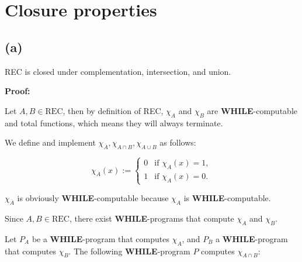 

\usepackage{graphicx}
\usepackage{xcolor}
\usepackage{listings}
\usepackage{tikz}



\setcounter{section}{1}


\section{Closure properties}

\subsection{(a)}
REC is closed under complementation, intersection, and union.

\textbf{Proof:}

Let $A, B \in \text{REC}$, then by definition of REC, $\chi_A$ and $\chi_B$ are \textbf{WHILE}-computable and total functions, which means they will always terminate.

We define and implement $\chi_{\overline{A}}, \chi_{A \cap B}, \chi_{A \cup B}$ as follows:

\[
\chi_{\overline{A}}(x) :=
\begin{cases}
    0 & \text{if } \chi_A(x) = 1, \\
    1 & \text{if } \chi_A(x) = 0.
\end{cases}
\]

$\chi_{\overline{A}}$ is obviously \textbf{WHILE}-computable because $\chi_A$ is \textbf{WHILE}-computable.

\bigskip

Since $A, B \in \text{REC}$, there exist \textbf{WHILE}-programs that compute $\chi_A$ and $\chi_B$.

Let $P_A$ be a \textbf{WHILE}-program that computes $\chi_A$, and $P_B$ a \textbf{WHILE}-program that computes $\chi_B$. The following \textbf{WHILE}-program $P$ computes $\chi_{A \cap B}$:

